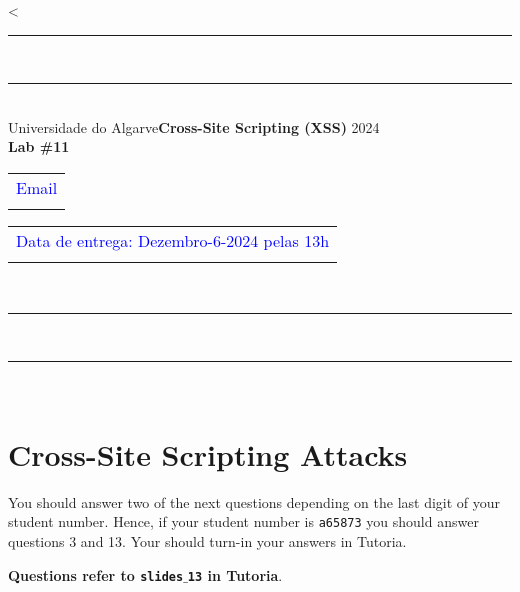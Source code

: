 \documentclass{article}
\begin{document}
<

\begin{center}
\rule{\textwidth}{.0075in} \\
\rule[3mm]{\textwidth}{.0075in}\\

Universidade do Algarve\hfill \textbf{Cross-Site Scripting (XSS)} \hfill 2024\\[3ex]

{\Large\bf Lab \#11} \\[3ex]

\begin{tabular}{l}
\textcolor{blue}{Email} \\ \hfill 
\end{tabular}
\begin{tabular}{l}
\textcolor{blue}{Data de entrega: Dezembro-6-2024 pelas 13h} \\ \hfill 
\end{tabular}\\

\rule{\textwidth}{.0075in} \\
\rule[3mm]{\textwidth}{.0075in} \\
\end{center}

\section*{Cross-Site Scripting Attacks}
You should answer two of the next questions depending on the last digit of your student
number. Hence, if your student number is \texttt{a65873} you should answer
questions 3 and 13. Your should turn-in your answers in Tutoria.

\bigskip 
\bigskip

{\large
  \noindent \textbf{Questions refer to \texttt{slides$\_$13} in Tutoria}. 
}
\bigskip
\bigskip
\end{document}
